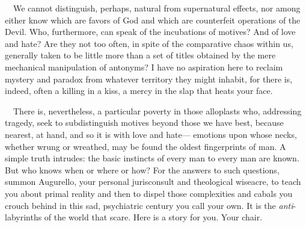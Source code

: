 ~~We cannot distinguish, perhaps, natural from supernatural effects, nor
among either know which are favors of God and which are counterfeit
operations of the Devil. Who, furthermore, can speak of the incubations
of motives? And of love and hate? Are they not too often, in spite of
the comparative chaos within us, generally taken to be little more than
a set of titles obtained by the mere mechanical manipulation of
antonyms? I have no aspiration here to reclaim mystery and paradox from
whatever territory they might inhabit, for there is, indeed, often a
killing in a kiss, a mercy in the slap that heats your face.

~~There is, nevertheless, a particular poverty in those alloplasts who,
addressing tragedy, seek to subdistinguish motives beyond those we have
best, because nearest, at hand, and so it is with love and hate---
emotions upon whose necks, whether wrung or wreathed, may be found the
oldest fingerprints of man. A simple truth intrudes: the basic instincts
of every man to every man are known. But who knows when or where or how?
For the answers to such questions, summon Augurello, your personal
jurisconsult and theological wiseacre, to teach you about primal reality
and then to dispel those complexities and cabals you crouch behind in
this sad, psychiatric century you call your own. It is the
\emph{anti}-labyrinths of the world that scare. Here is a story for you.
Your chair.

\vspace{0.4cm}

